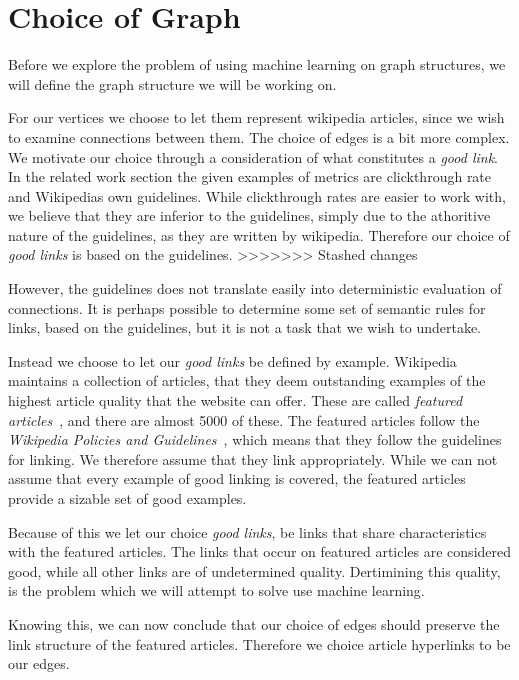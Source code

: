 \section{Choice of Graph}
Before we explore the problem of using machine learning on graph structures, we will define the graph structure we will be working on.

For our vertices we choose to let them represent wikipedia articles, since we wish to examine connections between them. The choice of edges is a bit more complex. We motivate our choice through a consideration of what constitutes a \emph{good link}. In the related work section the given examples of metrics are clickthrough rate and Wikipedias own guidelines. While clickthrough rates are easier to work with, we believe that they are inferior to the guidelines, simply due to the athoritive nature of the guidelines, as they are written by wikipedia. Therefore our choice of \emph{good links} is based on the guidelines.
>>>>>>> Stashed changes

However, the guidelines does not translate easily into deterministic evaluation of connections. It is perhaps possible to determine some set of semantic rules for links, based on the guidelines, but it is not a task that we wish to undertake.

Instead we choose to let our \emph{good links} be defined by example. Wikipedia maintains a collection of articles, that they deem outstanding examples of the highest article quality that the website can offer. These are called \emph{featured articles}~\cite{wiki-featured-articles}, and there are almost 5000 of these. The featured articles follow the \emph{Wikipedia Policies and Guidelines}~\cite{wiki-editor-guidelines}, which means that they follow the guidelines for linking. We therefore assume that they link appropriately. While we can not assume that every example of good linking is covered, the featured articles provide a sizable set of good examples.

Because of this we let our choice \emph{good links}, be links that share characteristics with the featured articles. The links that occur on featured articles are considered good, while all other links are of undetermined quality. Dertimining this quality, is the problem which we will attempt to solve use machine learning.

Knowing this, we can now conclude that our choice of edges should preserve the link structure of the featured articles. Therefore we choice article hyperlinks to be our edges.

